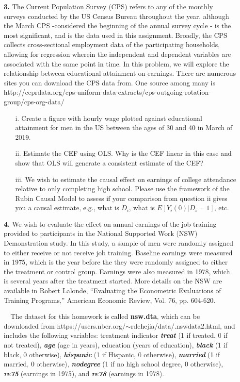 \documentclass[a4paper]{ctexart}
\theoremstyle{remark}
\begin{document}
\begin{itemize}
\item[\textbf{3.}] The Current Population Survey (CPS) refers to any of the monthly surveys conducted by the US Census Bureau throughout the year, although the March CPS -considered the beginning of the annual survey cycle - is the most significant, and is the data used in this assignment. Broadly, the CPS collects cross-sectional employment data of the participating households, allowing for regression wherein the independent and dependent variables are associated with the same point in time. In this problem, we will explore the relationship between educational attainment on earnings. There are numerous sites you can download the CPS data from. One source among many is http://ceprdata.org/cps-uniform-data-extracts/cps-outgoing-rotation-group/cps-org-data/
\begin{enumerate}
\item[i.] Create a figure with hourly wage plotted against educational attainment for men in the US between the ages of 30 and 40 in March of 2019.
\item[ii.]  Estimate the CEF using OLS. Why is the CEF linear in this case and show that OLS will generate a consistent estimate of the CEF?
\item[iii.]  We wish to estimate the causal effect on earnings of college attendance relative to only completing high school. Please use the framework of the Rubin Causal Model to assess if your comparison from question ii gives you a causal estimate, e.g., what is $D_i$, what is $E[Y_i(0)|D_i = 1]$, etc.
\end{enumerate}


\item[\textbf{4.}] We wish to evaluate the effect on annual earnings of the job training provided to participants in the National Supported Work (NSW) Demonstration study. In this study, a sample of men were randomly assigned to either receive or not receive job training. Baseline earnings were measured in 1975, which is the year before the they were randomly assigned to either the treatment or control group. Earnings were also measured in 1978, which is several years after the treatment started. More details on the NSW are available in Robert Lalonde, ``Evaluating the Econometric Evaluations of Training Programs,” American Economic Review, Vol. 76, pp. 604-620.

~~The dataset for this homework is called \textbf{nsw.dta}, which can be downloaded from https://users.nber.org/$\sim$rdehejia/data/.nswdata2.html,  and includes the following variables: treatment indicator \textit{\textbf{treat}} (1 if treated, 0 if not treated), \textit{\textbf{age}} (age in years), education (years of education), \textit{\textbf{black}} (1 if black, 0 otherwise), \textit{\textbf{hispanic}} (1 if Hispanic, 0 otherwise), \textit{\textbf{married}} (1 if married, 0 otherwise), \textit{\textbf{nodegree}} (1 if no high school degree, 0 otherwise), \textit{\textbf{re75}} (earnings in 1975), and \textit{\textbf{re78}} (earnings in 1978). 


\end{itemize}
\end{document}
